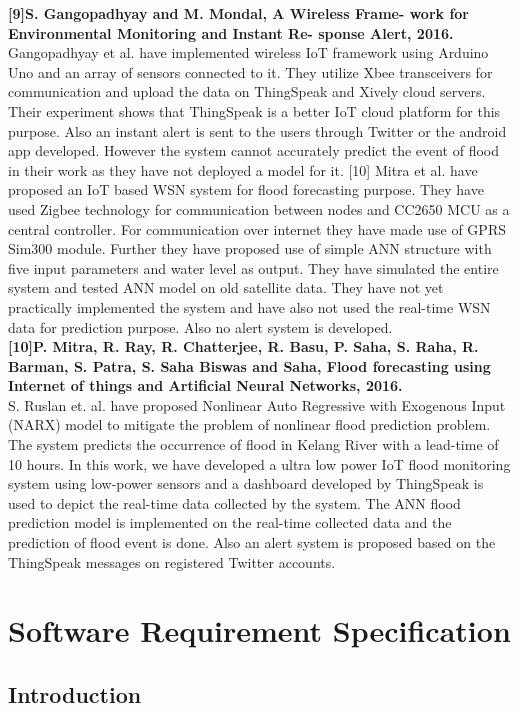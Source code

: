 \documentclass[a4paper,12pt]{report}
\begin{document}
\textbf{[9]S. Gangopadhyay and M. Mondal, A Wireless Frame-
work for Environmental Monitoring and Instant Re-
sponse Alert, 2016.}
\\ Gangopadhyay et al. have implemented wireless IoT
framework using Arduino Uno and an array of sensors
connected to it. They utilize Xbee transceivers for
communication and upload the data on ThingSpeak and Xively
cloud servers. Their experiment shows that ThingSpeak is a
better IoT cloud platform for this purpose. Also an instant alert
is sent to the users through Twitter or the android app developed.
However the system cannot accurately predict the event of flood
in their work as they have not deployed a model for it. [10] Mitra
et al. have proposed an IoT based WSN system for flood
forecasting purpose. They have used Zigbee technology for
communication between nodes and CC2650 MCU as a central
controller. For communication over internet they have made use
of GPRS Sim300 module. Further they have proposed use of
simple ANN structure with five input parameters and water level
as output. They have simulated the entire system and tested
ANN model on old satellite data. They have not yet practically
implemented the system and have also not used the real-time
WSN data for prediction purpose. Also no alert system is
developed.\\
\textbf{[10]P. Mitra, R. Ray, R. Chatterjee, R. Basu, P. Saha,
S. Raha, R. Barman, S. Patra, S. Saha Biswas and Saha, Flood forecasting using Internet of things and Artificial Neural Networks, 
2016.}\\
 S. Ruslan et. al. have proposed Nonlinear Auto Regressive
with Exogenous Input (NARX) model to mitigate the problem of
nonlinear flood prediction problem. The system predicts the
occurrence of flood in Kelang River with a lead-time of 10
hours.
In this work, we have developed a ultra low power IoT flood
monitoring system using low-power sensors and a dashboard
developed by ThingSpeak is used to depict the real-time data
collected by the system. The ANN flood prediction model is
implemented on the real-time collected data and the prediction
of flood event is done. Also an alert system is proposed based on
the ThingSpeak messages on registered Twitter accounts. 



\chapter {Software Requirement Specification}
\section{Introduction}
\end{document}
